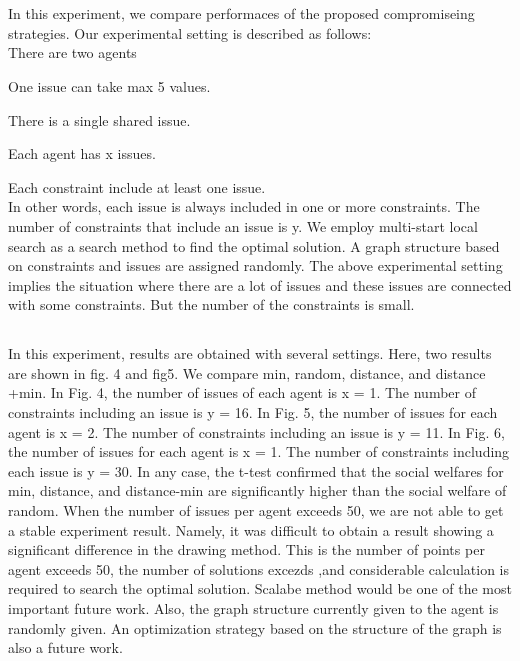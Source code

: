 \documentclass[paper]{ieice}
\begin{document}
\section{}
\subsection{}

In this experiment, we compare performaces of the proposed  compromiseing strategies. Our experimental setting is described as follows:\\


There are two agents

 One issue can take max 5 values.
 
 There is a single shared issue. 
 
 Each agent has x issues. 
 
 Each constraint include at least one issue.\\
 
 In other words, each issue is always included in one or more constraints. The number of constraints that include an issue is y. We employ multi-start local search as a search method to find the optimal solution. A graph structure based on constraints and issues are assigned randomly. The above experimental setting implies the situation where there are a lot of issues and these issues are connected with some constraints. But the number of the constraints is small. 



\subsection{}
In this experiment, results are obtained with several settings. Here, two results are shown in fig. 4 and fig5. We compare min, random, distance, and distance +min. In Fig. 4, the number of issues of each agent is x = 1. The number of constraints including an issue is y = 16. In Fig. 5, the number of issues for each agent is x = 2. The number of constraints including an issue is y = 11. In Fig. 6, the number of issues for each agent is x = 1. The number of constraints including each issue is y = 30. In any case, the t-test confirmed that the social welfares for min, distance, and distance-min are significantly higher than the social welfare of random. When the number of issues per agent exceeds 50, we are not able to get a stable experiment result. Namely, it was difficult to obtain a result showing a significant difference in the drawing method. This is the number of points per agent exceeds 50, the number of solutions excezds 
,and considerable calculation is required to search the optimal solution. Scalabe method would be one of the most important future work. Also, the graph structure currently given to the agent is randomly given. An optimization strategy based on the structure of the graph is also a future work.
\end{document}
